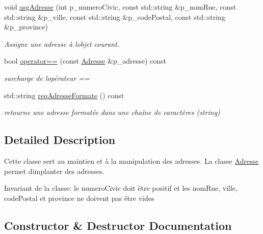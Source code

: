 \begin{DoxyCompactItemize}
void \hyperlink{classutil_1_1Adresse_ab76bad0bb5679f6b091f1bd3b84c5c1b}{asg\+Adresse} (int p\+\_\+numero\+Civic, const std\+::string \&p\+\_\+nom\+Rue, const std\+::string \&p\+\_\+ville, const std\+::string \&p\+\_\+code\+Postal, const std\+::string \&p\+\_\+province)
\begin{DoxyCompactList}\small\item\em Assigne une adresse à l\textquotesingle{}objet courant. \end{DoxyCompactList}\item 
bool \hyperlink{classutil_1_1Adresse_ac622c0ae30e1408c6f5e92e258455c96}{operator==} (const \hyperlink{classutil_1_1Adresse}{Adresse} \&p\+\_\+adresse) const
\begin{DoxyCompactList}\small\item\em surcharge de l\textquotesingle{}opérateur == \end{DoxyCompactList}\item 
std\+::string \hyperlink{classutil_1_1Adresse_ac16f05f371142a65c6f81dea5cce1606}{req\+Adresse\+Formate} () const
\begin{DoxyCompactList}\small\item\em retourne une adresse formatée dans une chaîne de caractères (string) \end{DoxyCompactList}\end{DoxyCompactItemize}


\subsection{Detailed Description}
Cette classe sert au maintien et à la manipulation des adresses. La classe \hyperlink{classutil_1_1Adresse}{Adresse} permet d\textquotesingle{}implanter des adresses. 

\begin{DoxyInvariant}{Invariant}
de la classe\+: le numero\+Civic doit être positif et les nom\+Rue, ville, code\+Postal et province ne doivent pas être vides 
\end{DoxyInvariant}


\subsection{Constructor \& Destructor Documentation}
\mbox{\label{classutil_1_1Adresse_a2c646a0226925bb32c4db8463ed887d5}} 
